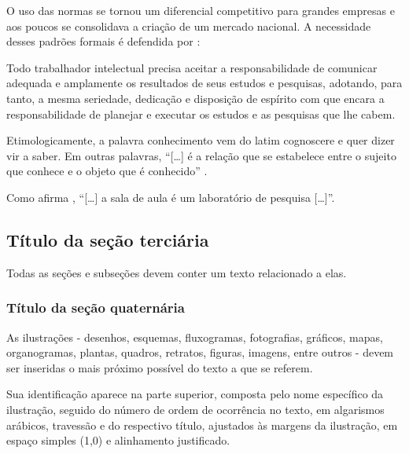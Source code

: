 O uso das normas se tornou um diferencial competitivo para grandes empresas e aos poucos se consolidava a criação de um mercado nacional. A necessidade desses padrões formais é defendida por :

\begin{SingleSpace}
\begin{flushright}
\begin{minipage}[b]{12cm}
\begin{small}
Todo trabalhador intelectual precisa aceitar a responsabilidade de comunicar adequada e amplamente os resultados de seus estudos e pesquisas, adotando, para tanto, a mesma seriedade, dedicação e disposição de espírito com que encara a responsabilidade de planejar e executar os estudos e as pesquisas que lhe cabem.
\end{small}
\end{minipage}
\end{flushright}
\end{SingleSpace}

Etimologicamente, a palavra conhecimento vem do latim cognoscere e quer dizer vir a saber. Em outras palavras, ``[…] é a relação que se estabelece entre o sujeito que conhece e o objeto que é conhecido'' \cite[p. 5]{cervo}.

Como afirma , ``[…] a sala de aula é um laboratório de pesquisa […]''.

\subsection{Título da seção terciária}

Todas as seções e subseções devem conter um texto relacionado a elas.

\subsubsection{Título da seção quaternária}

As ilustrações - desenhos, esquemas, fluxogramas, fotografias, gráficos, mapas, organogramas, plantas, quadros, retratos, figuras, imagens, entre outros - devem ser inseridas o mais próximo possível do texto a que se referem.

Sua identificação aparece na parte superior, composta pelo nome específico da ilustração, seguido do número de ordem de ocorrência no texto, em algarismos arábicos, travessão e do respectivo título, ajustados às margens da ilustração, em espaço simples (1,0) e alinhamento justificado.

